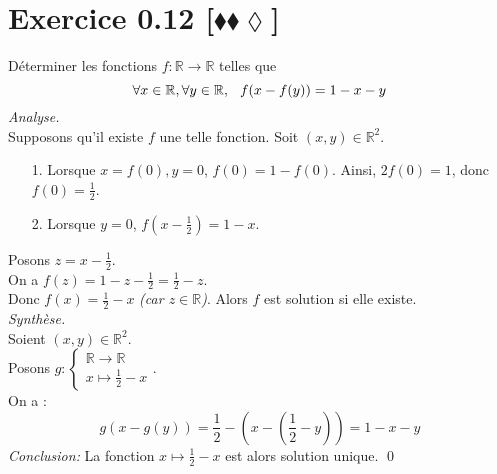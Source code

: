 \documentclass[10pt]{article}
\begin{document}
\section*{Exercice 0.12 [$\blacklozenge\blacklozenge\lozenge$]}
\begin{tcolorbox}[enhanced, width=7in, center, size=fbox, fontupper=\large, drop shadow southwest]
    Déterminer les fonctions $f: \mathbb{R} \rightarrow \mathbb{R}$ telles que 
    \begin{equation*}
        \forall{x\in\mathbb{R}},\forall{y\in\mathbb{R}}, \hspace{0.25cm} f(x-f(y)) = 1-x-y
    \end{equation*}
    \emph{Analyse.}\\
    Supposons qu'il existe $f$ une telle fonction. Soit $(x,y)\in\mathbb{R}^2$.
    \begin{itemize}
        \item[1.] Lorsque $x=f(0), y=0$, $f(0)=1-f(0)$. Ainsi, $2f(0)=1$, donc $f(0)=\frac{1}{2}$.
        \item[2.] Lorsque $y=0$, $f(x-\frac{1}{2})=1-x$.
    \end{itemize}
    Posons $z=x-\frac{1}{2}$.\\
    On a $f(z)=1-z-\frac{1}{2} = \frac{1}{2}-z$.\\
    Donc $f(x)=\frac{1}{2}-x$ \emph{(car $z\in\mathbb{R}$)}.
    Alors $f$ est solution si elle existe.\\[0.25cm]
    \emph{Synthèse.}\\
    Soient $(x,y)\in\mathbb{R}^2$.\\
    Posons $g:\begin{cases}\mathbb{R}\rightarrow\mathbb{R}\\x\mapsto{\frac{1}{2}-x}\end{cases}$.\\
    On a :
    \begin{equation*}
        g(x-g(y))=\frac{1}{2}-(x - (\frac{1}{2}-y)) = 1 - x - y
    \end{equation*}
    \emph{Conclusion:} 
    La fonction $x\mapsto\frac{1}{2}-x$ est alors solution unique. \qed
\end{tcolorbox}
\end{document}

